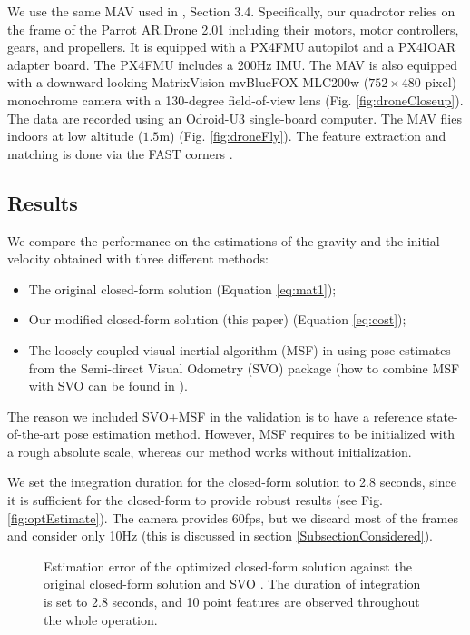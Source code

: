 \documentclass[letterpaper, 10 pt, journal, final]{ieeeconf}  %
\begin{document}
We use the same MAV used in \cite{FaesslerICRA15}, Section 3.4.
Specifically, our quadrotor relies on the frame of the Parrot AR.Drone 2.01 including their motors, motor controllers, gears, and propellers.
It is equipped with a PX4FMU autopilot and a PX4IOAR adapter board.
The PX4FMU includes a 200Hz IMU.
The MAV is also equipped with a downward-looking MatrixVision mvBlueFOX-MLC200w ($752 \times 480$-pixel) monochrome camera with a 130-degree field-of-view lens (Fig. \ref{fig:droneCloseup}).
The data are recorded using an Odroid-U3 single-board computer.
The MAV flies indoors at low altitude ($1.5$m) (Fig. \ref{fig:droneFly}).
The feature extraction and matching is done via the FAST corners \cite{Rosten2006}.

\subsection{Results}

We compare the performance on the estimations of the gravity and the initial velocity obtained with three different methods:
\begin{itemize}
\item The original closed-form solution \cite{Martinelli2014} (Equation \ref{eq:mat1});
\item Our modified closed-form solution (this paper) (Equation \ref{eq:cost});
\item The loosely-coupled visual-inertial algorithm (MSF) in \cite{LynenIROS13} using pose estimates from the Semi-direct Visual Odometry (SVO) package \cite{Forster2014} (how to combine MSF \cite{LynenIROS13} with SVO can be found in \cite{FaesslerICRA15}).
\end{itemize}
The reason we included SVO+MSF in the validation is to have a reference state-of-the-art pose estimation method.
However, MSF requires to be initialized with a rough absolute scale, whereas our method works without initialization.

We set the integration duration for the closed-form solution to 2.8 seconds, since it is sufficient for the closed-form to provide robust results (see Fig. \ref{fig:optEstimate}).
The camera provides 60fps, but we discard most of the frames and consider only 10Hz (this is discussed in section \ref{SubsectionConsidered}).

\begin{figure}
   \centering
   \resizebox{\columnwidth}{!}{}
   \caption{Estimation error of the optimized closed-form solution against the original closed-form solution \cite{Martinelli2014} and SVO \cite{FaesslerICRA15}. The duration of integration is set to 2.8 seconds, and 10 point features are observed throughout the whole operation.\label{fig:valid}}
\end{figure}
\end{document}
